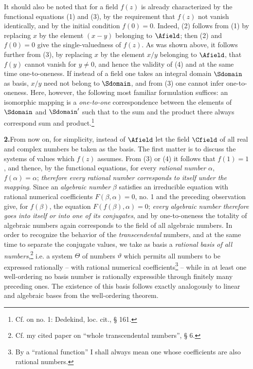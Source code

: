 It should also be noted that for a field \(f(z)\) is already characterized by the functional equations (1) and (3), by the requirement that \(f(z)\) not vanish identically, and by the initial condition \(f(0)=0\). Indeed, (2) follows from (1) by replacing \(x\) by the element \((x-y)\) belonging to \(\Afield\); then (2) and \(f(0)=0\) give the single-valuedness of \(f(z)\). As was shown above, it follows further from (3), by replacing \(x\) by the element \(x/y\) belonging to \(\Afield\), that \(f(y)\) cannot vanish for \(y\ne0\), and hence the validity of (4) and at the same time one-to-oneness. If instead of a field one takes an integral domain \(\Sdomain\) as basis, \(x/y\) need not belong to \(\Sdomain\), and from (3) one cannot infer one-to-oneness. Here, however, the following most familiar formulation suffices: an isomorphic mapping is a \emph{one-to-one} correspondence between the elements of \(\Sdomain\) and \(\Sdomain'\) such that to the sum and the product there always correspond sum and product.\footnote{Cf. on no. 1: Dedekind, loc. cit., § 161.}

\medskip
\noindent\textbf{2.}\quad From now on, for simplicity, instead of \(\Afield\) let the field \(\Cfield\) of all real and complex numbers be taken as the basis. The first matter is to discuss the systems of values which \(f(z)\) assumes. From (3) or (4) it follows that \(f(1)=1\), and thence, by the functional equations, for every \emph{rational number} \(\alpha\), \(f(\alpha)=\alpha\); \emph{therefore every rational number corresponds to itself under the mapping}. Since an \emph{algebraic number} \(\beta\) satisfies an irreducible equation with rational numerical coefficients \(F(\beta,\alpha)=0\), no. 1 and the preceding observation give, for \(f(\beta)\), the equation \(F(f(\beta),\alpha)=0\); \emph{every algebraic number therefore goes into itself or into one of its conjugates}, and by one-to-oneness the totality of algebraic numbers again corresponds to the field of all algebraic numbers. In order to recognize the behavior of the \emph{transcendental} numbers, and at the same time to separate the conjugate values, we take as basis a \emph{rational basis of all numbers},\footnote{Cf. my cited paper on ``whole transcendental numbers'', § 6.} i.e. a system \(\Theta\) of numbers \(\vartheta\) which permits all numbers to be expressed rationally -- with rational numerical coefficients\footnote{By a ``rational function'' I shall always mean one whose coefficients are also rational numbers.} -- while in at least one well-ordering no basis number is rationally expressible through finitely many preceding ones. The existence of this basis follows exactly analogously to linear and algebraic bases from the well-ordering theorem.

